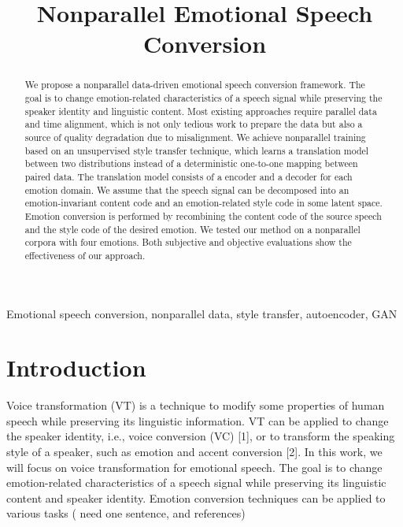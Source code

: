 \documentclass{article}
\title{Nonparallel Emotional Speech Conversion}
\begin{document}
%
\maketitle
%
\begin{abstract}
We propose a nonparallel data-driven emotional speech conversion framework. The goal is to change emotion-related characteristics of a speech signal while preserving the speaker identity and linguistic content. Most existing approaches require parallel data and time alignment, which is not only tedious work to prepare the data but also a source of quality degradation due to misalignment. We achieve nonparallel training based on an unsupervised style transfer technique, which learns a translation model between two distributions instead of a deterministic one-to-one mapping between paired data. The translation model consists of a encoder and a decoder for each emotion domain. We assume that the speech signal can be decomposed into an emotion-invariant content code and an emotion-related style code in some latent space. Emotion conversion is performed by recombining the content code of the source speech and the style code of the desired emotion. We tested our method on a nonparallel corpora with four emotions. Both subjective and objective evaluations show the effectiveness of our approach.
\end{abstract}

%
\begin{keywords}
Emotional speech conversion, nonparallel data, style transfer, autoencoder, GAN
\end{keywords}
%



\section{Introduction}
\label{sec:intro}
Voice transformation (VT) is a technique to modify some properties of human speech while preserving its linguistic information. VT can be applied to change the speaker identity, i.e., voice conversion (VC) [1], or to transform the speaking style of a speaker, such as emotion and accent conversion [2]. In this work, we will focus on voice transformation for emotional speech. The goal is to change emotion-related characteristics of a speech signal while preserving its linguistic content and speaker identity. Emotion conversion techniques can be applied to various tasks ({\color{blue} need one sentence, and references})
\end{document}
